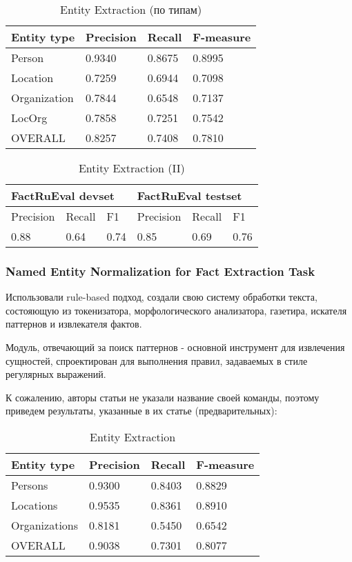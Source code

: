 \begin{table}[ht]
\centering
\caption{Entity Extraction (по типам)}
\label{factrueval_1_2}
\begin{tabular}{|l|l|l|l|}
\hline
Entity type         & Precision & Recall & F-measure     \\ \hline
Person       & 0.9340    & 0.8675 & 0.8995 \\ \hline
Location     & 0.7259    & 0.6944 & 0.7098 \\ \hline
Organization & 0.7844    & 0.6548 & 0.7137 \\ \hline
LocOrg       & 0.7858    & 0.7251 & 0.7542 \\ \hline
OVERALL      & 0.8257    & 0.7408 & 0.7810 \\ \hline
\end{tabular}
\end{table}



\begin{table}[ht]
\centering
\caption{Entity Extraction (II)}
\label{factrueval_1_3}
\begin{tabular}{|l|l|l|l|l|l|}
\hline
\multicolumn{3}{|l|}{FactRuEval devset} & \multicolumn{3}{l|}{FactRuEval testset} \\ \hline
Precision     & Recall     & F1         & Precision     & Recall     & F1         \\ \hline
0.88        & 0.64    & 0.74     & 0.85        & 0.69     & 0.76     \\ \hline
\end{tabular}
\end{table}

\subsubsection{Named Entity Normalization for Fact Extraction Task}

Использовали rule-based подход, создали свою систему обработки текста, состояющую из токенизатора, морфологического анализатора, газетира, искателя паттернов и извлекателя фактов. 

Модуль, отвечающий за поиск паттернов - основной инструмент для извлечения сущностей, спроектирован для выполнения правил, задаваемых в стиле регулярных выражений.

К сожалению, авторы статьи не указали название своей команды, поэтому приведем результаты, указанные в их статье (предварительных):

\begin{table}[ht]
\centering
\caption{Entity Extraction}
\label{factrueval_2_1}
\begin{tabular}{|l|l|l|l|}
\hline
Entity type   & Precision & Recall & F-measure \\ \hline
Persons       & 0.9300    & 0.8403 & 0.8829    \\ \hline
Locations     & 0.9535    & 0.8361 & 0.8910    \\ \hline
Organizations & 0.8181    & 0.5450 & 0.6542    \\ \hline
OVERALL       & 0.9038    & 0.7301 & 0.8077    \\ \hline
\end{tabular}
\end{table}

